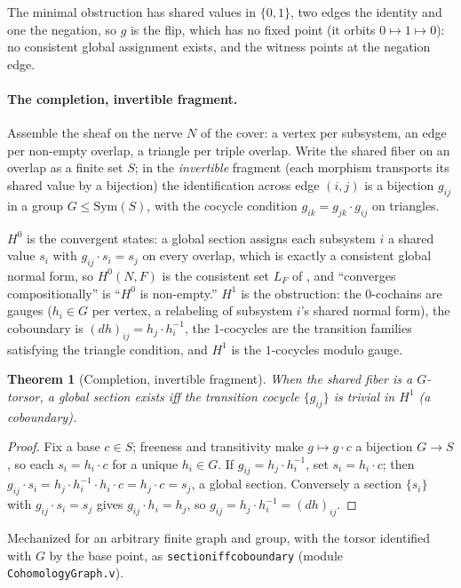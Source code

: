 \documentclass[11pt,a4paper]{article}
\theoremstyle{plain}
\newtheorem{theorem}{Theorem}[section]
\theoremstyle{definition}
\theoremstyle{remark}
\newcommand{\Hz}{H^0}
\newcommand{\Ho}{H^1}
\renewcommand{\_}{\origunderscore\allowbreak}
\begin{document}
The minimal obstruction has shared values in $\{0,1\}$, two edges the identity and one the negation,
so $g$ is the flip, which has no fixed point (it orbits $0 \mapsto 1 \mapsto 0$): no consistent global
assignment exists, and the witness points at the negation edge.

\paragraph{The completion, invertible fragment.} Assemble the sheaf on the nerve $N$ of the cover: a
vertex per subsystem, an edge per non-empty overlap, a triangle per triple overlap. Write the shared
fiber on an overlap as a finite set $S$; in the \emph{invertible} fragment (each morphism transports
its shared value by a bijection) the identification across edge $(i,j)$ is a bijection $g_{ij}$ in a
group $G \leq \mathrm{Sym}(S)$, with the cocycle condition $g_{ik} = g_{jk} \cdot g_{ij}$ on
triangles.

$\Hz$ is the convergent states: a global section assigns each subsystem $i$ a shared value $s_i$ with
$g_{ij} \cdot s_i = s_j$ on every overlap, which is exactly a consistent global normal form, so
$\Hz(N, F)$ is the consistent set $L_F$ of , and ``converges compositionally'' is
``$\Hz$ is non-empty.'' $\Ho$ is the obstruction: the $0$-cochains are gauges ($h_i \in G$ per
vertex, a relabeling of subsystem $i$'s shared normal form), the coboundary is
$(dh)_{ij} = h_j \cdot h_i^{-1}$, the $1$-cocycles are the transition families satisfying the triangle
condition, and $\Ho$ is the $1$-cocycles modulo gauge.

\begin{theorem}[Completion, invertible fragment]
\label{thm:completion}
When the shared fiber is a $G$-torsor, a global section exists iff the transition cocycle
$\{g_{ij}\}$ is trivial in $\Ho$ (a coboundary).
\end{theorem}
\begin{proof}
Fix a base $c \in S$; freeness and transitivity make $g \mapsto g \cdot c$ a bijection $G \to S$, so
each $s_i = h_i \cdot c$ for a unique $h_i \in G$. If $g_{ij} = h_j \cdot h_i^{-1}$, set
$s_i = h_i \cdot c$; then $g_{ij} \cdot s_i = h_j \cdot h_i^{-1} \cdot h_i \cdot c = h_j \cdot c = s_j$,
a global section. Conversely a section $\{s_i\}$ with $g_{ij} \cdot s_i = s_j$ gives
$g_{ij} \cdot h_i = h_j$, so $g_{ij} = h_j \cdot h_i^{-1} = (dh)_{ij}$.
\end{proof}
\noindent Mechanized for an arbitrary finite graph and group, with the torsor identified with $G$ by
the base point, as \texttt{section\_iff\_coboundary} (module \texttt{CohomologyGraph.v}).
\end{document}
